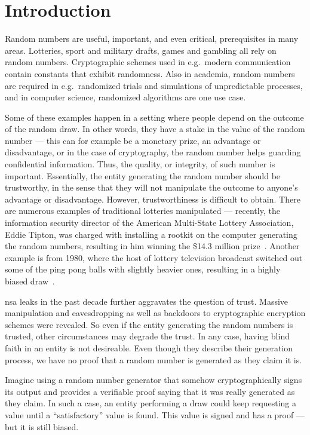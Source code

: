 \section{Introduction}\label{cha:introduction}

Random numbers are useful, important, and even critical, prerequisites in many areas.
Lotteries, sport and military drafts, games and gambling all rely on random numbers.
Cryptographic schemes used in e.g.\ modern communication contain constants that exhibit randomness.
Also in academia, random numbers are required in e.g.\ randomized trials and simulations of unpredictable processes, and in computer science, randomized algorithms are one use case.

Some of these examples happen in a setting where people depend on the outcome of the random draw.
In other words, they have a stake in the value of the random number --- this can for example be a monetary prize, an advantage or disadvantage, or in the case of cryptography, the random number helps guarding confidential information.
Thus, the quality, or integrity, of such number is important.
Essentially, the entity generating the random number should be trustworthy, in the sense that they will not manipulate the outcome to anyone's advantage or disadvantage.
However, trustworthiness is difficult to obtain.
There are numerous examples of traditional lotteries manipulated --- recently, the information security director of the American Multi-State Lottery Association, Eddie Tipton, was charged with installing a rootkit on the computer generating the random numbers, resulting in him winning the \$14.3 million prize~\cite{bbclotteryexploit}.
Another example is from 1980, where the host of lottery television broadcast switched out some of the ping pong balls with slightly heavier ones, resulting in a highly biased draw~\cite{lotteryscandal-666}.

\gls{nsa} leaks in the past decade further aggravates the question of trust.
Massive manipulation and eavesdropping as well as backdoors to cryptographic encryption schemes were revealed.
So even if the entity generating the random numbers is trusted, other circumstances may degrade the trust.
In any case, having blind faith in an entity is not desireable.
Even though they describe their generation process, we have no proof that a random number is generated as they claim it is.

Imagine using a random number generator that somehow cryptographically signs its output and provides a verifiable proof saying that it was really generated  as they claim.
In such a case, an entity performing a draw could keep requesting a value until a \enquote{satisfactory} value is found.
This value is signed and has a proof --- but it is still biased.

